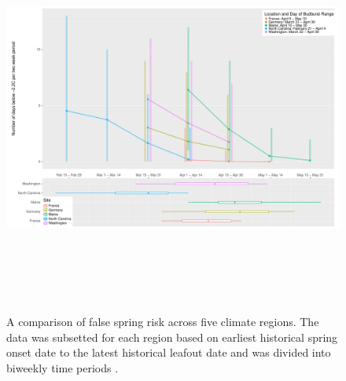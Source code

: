 \documentclass{article}\usepackage[]{graphicx}\usepackage[]{color}
\begin{document}
\begin{figure} [H] 
\begin{center}
\includegraphics[width=16cm, height=13cm]{..//figure/RegionalRisk.pdf} 
\caption{A comparison of false spring risk across five climate regions. The data was subsetted for each region based on earliest historical spring onset date to the latest historical leafout date and was divided into biweekly time periods \citep{Schaber2005, White2009, Soudani2012, USA-NPN2016}.}\label{fig:regional} 
\end{center}
\end{figure}
\end{document}
